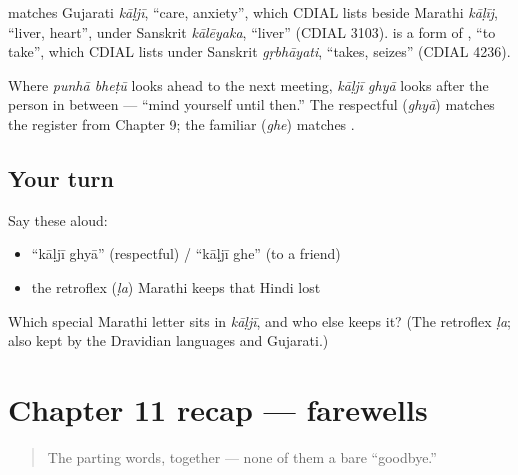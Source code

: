 \begin{cousinweb}
\textbf{} matches Gujarati \emph{kāḷjī}, \textquotedblleft{}care, anxiety\textquotedblright{}, which CDIAL lists beside Marathi \emph{kāḷīj}, \textquotedblleft{}liver, heart\textquotedblright{}, under Sanskrit \emph{kālēyaka}, \textquotedblleft{}liver\textquotedblright{} (CDIAL 3103). \textbf{} is a form of \textbf{}, \textquotedblleft{}to take\textquotedblright{}, which CDIAL lists under Sanskrit \emph{gṛbhāyati}, \textquotedblleft{}takes, seizes\textquotedblright{} (CDIAL 4236).
\end{cousinweb}

\begin{culture}
Where \emph{punhā bheṭū} looks ahead to the next meeting, \emph{kāḷjī ghyā} looks after the person in between — \textquotedblleft{}mind yourself until then.\textquotedblright{} The respectful \textbf{} (\emph{ghyā}) matches the \textbf{} register from Chapter 9; the familiar \textbf{} (\emph{ghe}) matches \textbf{}.
\end{culture}

\subsection*{Your turn}
Say these aloud:

\begin{itemize}
\raggedright
  \item \textquotedblleft{}kāḷjī ghyā\textquotedblright{} (respectful) / \textquotedblleft{}kāḷjī ghe\textquotedblright{} (to a friend)
  \item the retroflex  (\emph{ḷa}) Marathi keeps that Hindi lost
\end{itemize}

\begin{tcolorbox}[breakable,colback=teal!4,colframe=teal!35!black,title={Before you move on}]
Which special Marathi letter sits in \emph{kāḷjī}, and who else keeps it? (The retroflex \textbf{} \emph{ḷa}; also kept by the Dravidian languages and Gujarati.)
\end{tcolorbox}
\section[Practice]{Chapter 11 recap — farewells}

\label{lesson:MR-C04-practice}



\begin{quote}
The parting words, together — none of them a bare \textquotedblleft{}goodbye.\textquotedblright{}
\end{quote}

